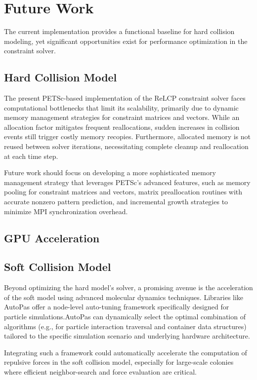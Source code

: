 \documentclass[conference]{IEEEtran}
\begin{document}
\newpage
\section{Future Work}

The current implementation provides a functional baseline for hard collision modeling, yet significant opportunities exist for performance optimization in the constraint solver.

\subsection{Hard Collision Model}
The present PETSc-based implementation of the ReLCP constraint solver faces computational bottlenecks that limit its scalability, primarily due to dynamic memory management strategies for constraint matrices and vectors. While an allocation factor mitigates frequent reallocations, sudden increases in collision events still trigger costly memory recopies. Furthermore, allocated memory is not reused between solver iterations, necessitating complete cleanup and reallocation at each time step.

Future work should focus on developing a more sophisticated memory management strategy that leverages PETSc's advanced features, such as memory pooling for constraint matrices and vectors, matrix preallocation routines with accurate nonzero pattern prediction, and incremental growth strategies to minimize MPI synchronization overhead.


\subsection{GPU Acceleration}

\cite{Tasora2008}

\subsection{Soft Collision Model}

Beyond optimizing the hard model's solver, a promising avenue is the acceleration of the soft model using advanced molecular dynamics techniques. Libraries like AutoPas\cite{AutoPasGithub,Gratl2019,Newcome2023} offer a node-level auto-tuning framework specifically designed for particle simulations.AutoPas can dynamically select the optimal combination of algorithms (e.g., for particle interaction traversal and container data structures) tailored to the specific simulation scenario and underlying hardware architecture.

Integrating such a framework could automatically accelerate the computation of repulsive forces in the soft collision model, especially for large-scale colonies where efficient neighbor-search and force evaluation are critical.

\newpage

\balance



\newpage
\tableofcontents
\end{document}
